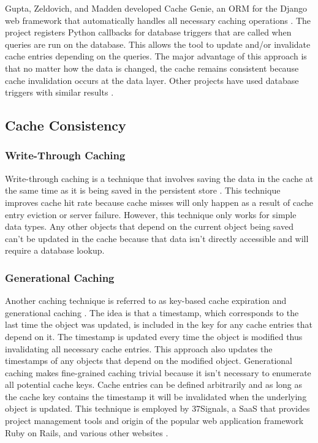 \documentclass[12pt]{ucthesis}
\begin{document}
Gupta, Zeldovich, and Madden developed Cache Genie, an ORM for the Django web framework that automatically handles all necessary caching operations \cite{triggerBasedORM}.
The project registers Python callbacks for database triggers that are called when queries are run on the database.
This allows the tool to update and/or invalidate cache entries depending on the queries.
The major advantage of this approach is that no matter how the data is changed, the cache remains consistent because cache invalidation occurs at the data layer.
Other projects have used database triggers with similar results \cite{scalableConsistentCaching}.

\subsection{Cache Consistency}
\subsubsection{Write-Through Caching}
Write-through caching is a technique that involves saving the data in the cache at the same time as it is being saved in the persistent store \cite{writeThroughCaching}.
This technique improves cache hit rate because cache misses will only happen as a result of cache entry eviction or server failure.
However, this technique only works for simple data types.
Any other objects that depend on the current object being saved can't be updated in the cache because that data isn't directly accessible and will require a database lookup.

\subsubsection{Generational Caching}
Another caching technique is referred to as key-based cache expiration \cite{keyBasedCacheExpiration} and generational caching \cite{generationalCaching}.
The idea is that a timestamp, which corresponds to the last time the object was updated, is included in the key for any cache entries that depend on it.
The timestamp is updated every time the object is modified thus invalidating all necessary cache entries.
This approach also updates the timestamps of any objects that depend on the modified object.
Generational caching makes fine-grained caching trivial because it isn't necessary to enumerate all potential cache keys.
Cache entries can be defined arbitrarily and as long as the cache key contains the timestamp it will be invalidated when the underlying object is updated.
This technique is employed by \textsf{37Signals}, a SaaS that provides project management tools and origin of the popular web application framework Ruby on Rails\cite{37SignalsDotCom}, and various other websites \cite{keyBasedCacheExpiration}.
\end{document}
